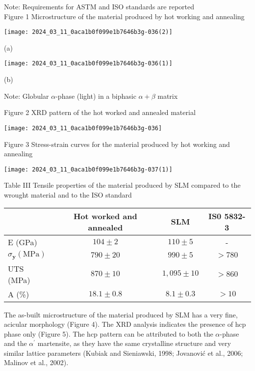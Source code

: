 \documentclass[10pt]{article}
\begin{document}
Note: Requirements for ASTM and ISO standards are reported\\
Figure 1 Microstructure of the material produced by hot working and annealing

\begin{center}
\texttt{[image: 2024\_03\_11\_0aca1b0f099e1b7646b3g-036(2)]}
\end{center}

(a)

\begin{center}
\texttt{[image: 2024\_03\_11\_0aca1b0f099e1b7646b3g-036(1)]}
\end{center}

(b)

Note: Globular $\alpha$-phase (light) in a biphasic $\alpha+\beta$ matrix

Figure 2 XRD pattern of the hot worked and annealed material

\begin{center}
\texttt{[image: 2024\_03\_11\_0aca1b0f099e1b7646b3g-036]}
\end{center}

Figure 3 Stress-strain curves for the material produced by hot working and annealing

\begin{center}
\texttt{[image: 2024\_03\_11\_0aca1b0f099e1b7646b3g-037(1)]}
\end{center}

Table III Tensile properties of the material produced by SLM compared to the wrought material and to the ISO standard

\begin{center}
\begin{tabular}{lccc}
\hline
 & Hot worked and annealed & SLM & IS0 5832-3 \\
\hline
E (GPa) & $104 \pm 2$ & $110 \pm 5$ & - \\
$\sigma_{\mathbf{y}}(\mathrm{MPa})$ & $790 \pm 20$ & $990 \pm 5$ & $>780$ \\
UTS (MPa) & $870 \pm 10$ & $1,095 \pm 10$ & $>860$ \\
A (\%) & $18.1 \pm 0.8$ & $8.1 \pm 0.3$ & $>10$ \\
\hline
\end{tabular}
\end{center}

The as-built microstructure of the material produced by SLM has a very fine, acicular morphology (Figure 4). The XRD analysis indicates the presence of hcp phase only (Figure 5). The hcp pattern can be attributed to both the $\alpha$-phase and the $\alpha^{\prime}$ martensite, as they have the same crystalline structure and very similar lattice parameters (Kubiak and Sieniawski, 1998; Jovanović et al., 2006; Malinov et al., 2002).
\end{document}
